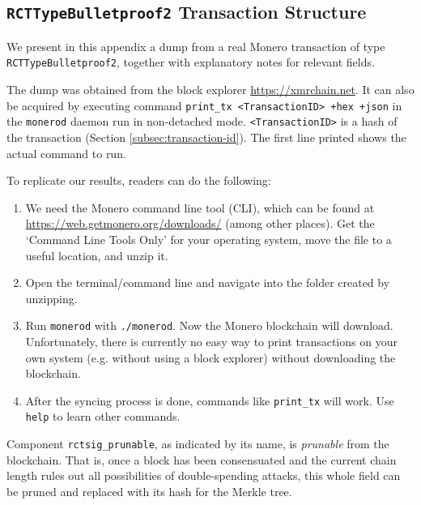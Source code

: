 \begin{appendices}

\renewcommand{\theFancyVerbLine}{%
	\textcolor{red}{\small
		\arabic{FancyVerbLine}}}

\chapter{{\tt RCTTypeBulletproof2} Transaction Structure}
\label{appendix:RCTTypeBulletproof2}

We present in this appendix a dump from a real Monero transaction of type {\tt RCTTypeBulletproof2}, 
together with explanatory notes for relevant fields.

The dump was obtained from the block explorer \url{https://xmrchain.net}. It can also be acquired by executing command {\tt print\_tx <TransactionID> +hex +json} in the {\tt monerod} daemon run in non-detached mode. {\tt <TransactionID>} is a hash of the transaction (Section \ref{subsec:transaction-id}). The first line printed shows the actual command to run.%

To replicate our results, readers can do the following:%
\begin{enumerate}
    \item We need the Monero command line tool (CLI), which can be found at \url{https://web.getmonero.org/downloads/} (among other places). Get the `Command Line Tools Only' for your operating system, move the file to a useful location, and unzip it.
    \item Open the terminal/command line and navigate into the folder created by unzipping.
    \item Run {\tt monerod} with {\tt ./monerod}. Now the Monero blockchain will download. Unfortunately, there is currently no easy way to print transactions on your own system (e.g. without using a block explorer) without downloading the blockchain.
    \item After the syncing process is done, commands like {\tt print\_tx} will work. Use {\tt help} to learn other commands.
\end{enumerate}


Component {\tt rctsig\_prunable}, as indicated by its name, is {\sl prunable} from the blockchain. That is, once a block has been consensuated and the current chain length rules out all possibilities of double-spending attacks, this whole field can be pruned and replaced with its hash for the Merkle tree.


\end{appendices}
